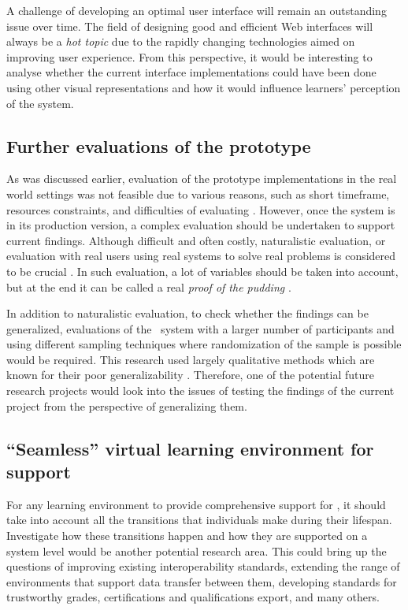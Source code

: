 A challenge of developing an optimal user interface will remain an outstanding
issue over time. The field of designing good and efficient Web interfaces will
always be a \textit{hot topic} due to the rapidly changing technologies aimed on
improving user experience. From this perspective, it would be interesting to
analyse whether the current interface implementations could have been done using
other visual representations and how it would influence learners' perception of
the system.

\subsection{Further evaluations of the prototype}
As was discussed earlier, evaluation of the prototype implementations in the
real world settings was not feasible due to various reasons, such as short
timeframe, resources constraints, and difficulties of evaluating \LLLsn.
However, once the system is in its production version, a complex evaluation
should be undertaken to support current findings. Although difficult and often
costly, naturalistic evaluation, or evaluation with real users using real
systems to solve real problems is considered to be crucial
\citep{Pries-Heje2008}. In such evaluation, a lot of variables should be taken
into account, but at the end it can be called a real \textit{proof of the
pudding} \citep{Venable2010}.

In addition to naturalistic evaluation, to check whether the findings can be
generalized, evaluations of the \ep~system with a larger number of participants
and using different sampling techniques where randomization of the sample is
possible would be required. This research used largely qualitative methods which
are known for their poor generalizability \citep{Trochim2001}. Therefore, one of
the potential future research projects would look into the issues of testing the
findings of the current project from the perspective of generalizing them.

\subsection[``Seamless'' environment for \LLLs support]{``Seamless'' virtual
learning environment for \LLLs support} 
For any learning environment to provide comprehensive support for \LLLs, it
should take into account all the transitions that individuals make during their
lifespan. Investigate how these transitions happen and how they are supported on
a system level would be another potential research area. This could bring up the
questions of improving existing interoperability standards, extending the range
of environments that support data transfer between them, developing standards
for trustworthy grades, certifications and qualifications export, and many
others.

